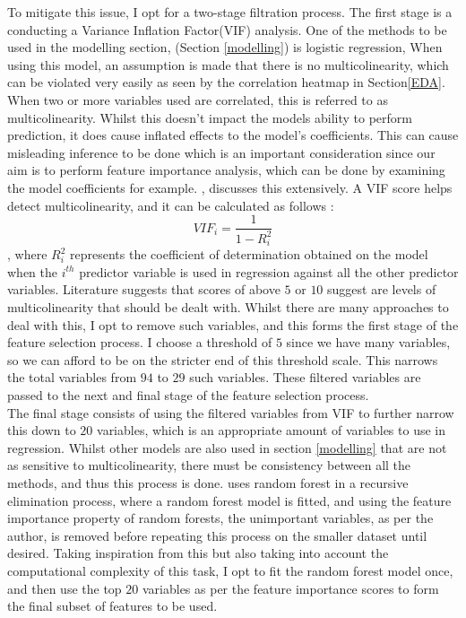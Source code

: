 \documentclass[11pt]{article}
\begin{document}
To mitigate this issue, I opt for a two-stage filtration process. The first stage is a conducting a Variance Inflation Factor(VIF) analysis. One of the methods to be used in the modelling section, (Section \ref{modelling}) is logistic regression, When using this model, an assumption is made that there is no multicolinearity, which can be violated very easily as seen by the correlation heatmap in Section\ref{EDA}. When two or more variables used are correlated, this is referred to as multicolinearity. Whilst this doesn't impact the models ability to perform prediction, it does cause inflated effects to the model's coefficients. This can cause misleading inference to be done which is an important consideration since our aim is to perform feature importance analysis, which can be done by examining the model coefficients for example. \cite{multicolinearity}, \cite{multicolinearity_midi} discusses this extensively. A VIF score helps detect multicolinearity, and it can be calculated as follows : 
$$
VIF_{i} = \frac{1}{1 - R_i^2} 
$$,
where $R_i^2$ represents the coefficient of determination obtained on the model when the $i^{th}$ predictor variable is used in regression against all the other predictor variables. Literature suggests that scores of above $5$ or $10$ suggest are levels of multicolinearity that should be dealt with. Whilst there are many approaches to deal with this, I opt to remove such variables, and this forms the first stage of the feature selection process. I choose a threshold of $5$ since we have many variables, so we can afford to be on the stricter end of this threshold scale. This narrows the total variables from $94$ to $29$ such variables. These filtered variables are passed to the next and final stage of the feature selection process. \\

The final stage consists of using the filtered variables from VIF to further narrow this down to $20$ variables, which is an appropriate amount of variables to use in regression. Whilst other models are also used in section \ref{modelling} that are not as sensitive to multicolinearity, there must be consistency between all the methods, and thus this process is done. \cite{random_forest_rfe} uses random forest in a recursive elimination process, where a random forest model is fitted, and using the feature importance property of random forests, the unimportant variables, as per the author, is removed before repeating this process on the smaller dataset until desired. Taking inspiration from this but also taking into account the computational complexity of this task, I opt to fit the random forest model once, and then use the top $20$ variables as per the feature importance scores to form the final subset of features to be used. \\
\end{document}
